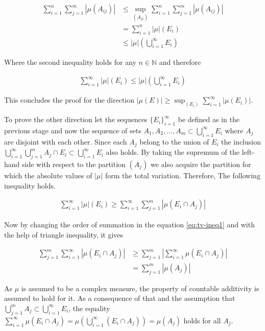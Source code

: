 \documentclass[12pt]{artikel1}
\begin{document}
\begin{align*}
    \sum_{i=1}^n\sum_{j=1}^m|\mu(A_{ij})|&\leq\sup_{(A_{ji})}\sum_{i=1}^n\sum_{j=1}^m |\mu(A_{ij})| \\
    &=\sum_{i=1}^n|\mu|(E_i) \\
    &\leq|\mu|\left(\bigcup_{i=1}^\infty E_i\right)
\end{align*}

\noindent Where the second inequality holds for any $n\in\mathbb{N}$ and therefore 

\begin{gather*}
    \sum_{i=1}^\infty|\mu|(E_i)\leq|\mu|\left(\bigcup_{i=1}^\infty E_i\right)
\end{gather*}

\noindent This concludes the proof for the direction $|\mu(E)|\geq\sup_{(E_i)}\sum_{i=1}^\infty |\mu(E_i)|$. 

To prove the other direction let the sequences $\{E_i\}_{i=1}^\infty$ be defined as in the previous stage and now the sequence of sets $A_{1},A_{2},\ldots,A_{m}\subset\bigcup_{i=1}^\infty E_i$ where $A_j$ are disjoint with each other. Since each $A_j$ belong to the union of $E_i$ the inclusion $\bigcup_{i=1}^\infty \bigcup_{j=1}^m A_j\cap E_i\subset\bigcup_{i=1}^\infty E_i$ also holds. By taking the supremum of the left-hand side with respect to the partition $(A_j)$ we also acquire the partition for which the absolute values of $|\mu|$ form the total variation. Therefore, The following inequality holds. 

\begin{align}\label{eq:tv-ineq1}
    \sum_{i=1}^\infty|\mu|(E_i)\geq\sum_{i=1}^\infty\sum_{j=1}^m|\mu(E_i\cap A_j)|
\end{align}

Now by changing the order of summation in the equation \ref{eq:tv-ineq1} and with the help of triangle inequality, it gives

\begin{align}\label{eq:tv-ineq2}
    \sum_{j=1}^m\sum_{i=1}^\infty|\mu(E_i\cap A_j)|&\geq\sum_{j=1}^m|\sum_{i=1}^\infty\mu(E_i\cap A_j)| \\
    &=\sum_{j=1}^m|\mu(A_j)|
\end{align}

\noindent As $\mu$ is assumed to be a complex measure, the property of countable additivity is assumed to hold for it. As a consequence of that and the assumption that $\bigcup_{j=1}^m A_j\subset\bigcup_{i=1}^\infty E_i$, the equality $\sum_{i=1}^\infty\mu(E_i\cap A_j)=\mu\left(\bigcup_{i=1}^\infty (E_i\cap A_j)\right)=\mu(A_j)$ holds for all $A_j$.
\end{document}
